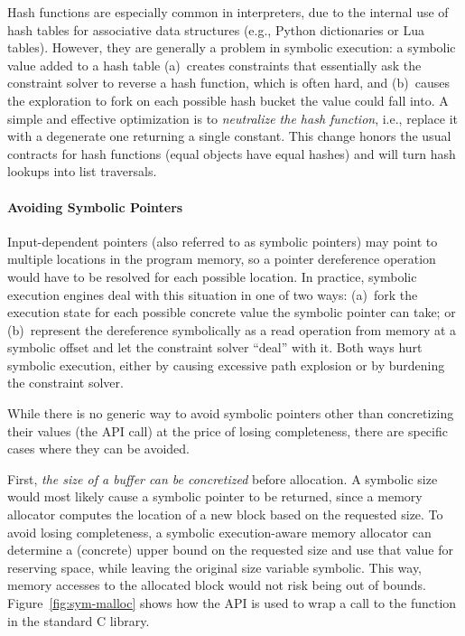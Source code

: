 Hash functions are especially common in interpreters, due to the internal use of hash tables for associative data structures (e.g., Python dictionaries or Lua tables).  However, they are generally a problem in symbolic execution: a symbolic value added to a hash table (a)~creates constraints that essentially ask the constraint solver to reverse a hash function, which is often hard, and (b)~causes the exploration to fork on each possible hash bucket the value could fall into.
%
A simple and effective optimization is to \emph{neutralize the hash function}, i.e., replace it with a degenerate one returning a single constant. This change honors the usual contracts for hash functions (equal objects have equal hashes) and will turn hash lookups into list traversals.

\paragraph{Avoiding Symbolic Pointers}

Input-dependent pointers (also referred to as symbolic pointers) may point to multiple locations in the program memory, so a pointer dereference operation would have to be resolved for each possible location.  In practice, symbolic execution engines deal with this situation in one of two ways:
%
(a)~fork the execution state for each possible concrete value the symbolic pointer can take; or
%
(b)~represent the dereference symbolically as a read operation from memory at a symbolic offset and let the constraint solver ``deal'' with it.
%
Both ways hurt symbolic execution, either by causing excessive path explosion or by burdening the constraint solver.

While there is no generic way to avoid symbolic pointers other than concretizing their values (the  API call) at the price of losing completeness, there are specific cases where they can be avoided.

First, \emph{the size of a buffer can be concretized} before allocation.  A symbolic size would most likely cause a symbolic pointer to be returned, since a memory allocator computes the location of a new block based on the requested size.  To avoid losing completeness, a symbolic execution-aware memory allocator can determine a (concrete) upper bound on the requested size and use that value for reserving space, while leaving the original size variable symbolic.  This way, memory accesses to the allocated block would not risk being out of bounds.  Figure~\ref{fig:sym-malloc} shows how the \chef API is used to wrap a call to the  function in the standard C library.

